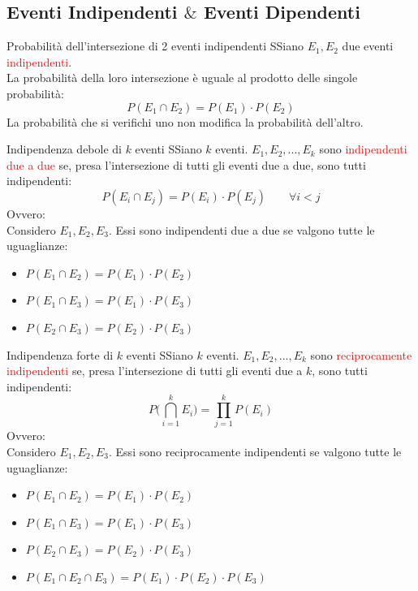 \documentclass{article}  %
\theoremstyle{definition}
\begin{document}
\subsection{Eventi Indipendenti $\&$ Eventi Dipendenti}
\begin{theorem}{Probabilità dell'intersezione di 2 eventi indipendenti}
	SSiano $E_1, E_2$ due eventi \textcolor{red}{indipendenti}. \\
	La probabilità della loro intersezione è uguale al prodotto delle singole probabilità:
	\[
		P(E_1 \cap E_2)=P(E_1) \cdot P(E_2)
	\]
	La probabilità che si verifichi uno non modifica la probabilità dell'altro.
\end{theorem}
\begin{theorem}{Indipendenza debole di $k$ eventi}
	SSiano $k$ eventi. $E_1, E_2, ..., E_k$ sono \textcolor{red}{indipendenti due a due} se, presa l'intersezione di tutti gli eventi due a due, sono tutti
	indipendenti:
	\[
		P(E_i \cap E_j)=P(E_i) \cdot P(E_j) \quad \quad \forall{i < j}
	\]
	Ovvero: \\ Considero $E_1,E_2,E_3$. Essi sono indipendenti due a due se valgono tutte le uguaglianze:
	\begin{itemize}
		\item $P(E_1 \cap E_2)=P(E_1) \cdot P(E_2)$
		\item $P(E_1 \cap E_3)=P(E_1) \cdot P(E_3)$
		\item $P(E_2 \cap E_3)=P(E_2) \cdot P(E_3)$
	\end{itemize}
\end{theorem}
\begin{theorem}{Indipendenza forte di $k$ eventi}
	SSiano $k$ eventi. $E_1, E_2, ..., E_k$ sono \textcolor{red}{reciprocamente indipendenti} se, presa l'intersezione di tutti gli eventi due a $k$, sono tutti
	indipendenti:
	\[
		P\Big(\bigcap_{i=1}^{k} E_{i}\Big)
		=
		\prod_{j=1}^{k} P(E_{i})
	\]
	Ovvero:
	\\ Considero $E_1,E_2,E_3$. Essi sono reciprocamente indipendenti se valgono tutte le uguaglianze:
	\begin{itemize}
		\item $P(E_1 \cap E_2)=P(E_1) \cdot P(E_2)$
		\item $P(E_1 \cap E_3)=P(E_1) \cdot P(E_3)$
		\item $P(E_2 \cap E_3)=P(E_2) \cdot P(E_3)$
		\item $P(E_1 \cap E_2 \cap E_3)=P(E_1) \cdot P(E_2) \cdot P(E_3)$
	\end{itemize}
\end{theorem}
\end{document}
